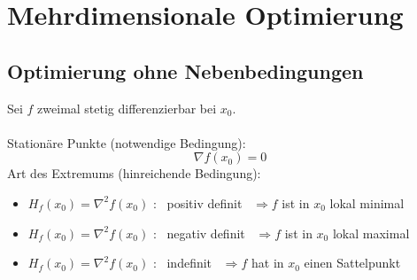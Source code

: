 \section{Mehrdimensionale Optimierung} %
\label{sec:mehrdimensionale_optimierung}

\subsection{Optimierung ohne Nebenbedingungen} %
\label{sub:optimierung_ohne_nebenbedingungen}
Sei $f$ zweimal stetig differenzierbar bei $x_0$.
\\\\Stationäre Punkte (notwendige Bedingung):
\begin{equation}
	\nabla f (x_0) = 0
\end{equation}
Art des Extremums (hinreichende Bedingung):

\begin{itemize}
	\item $H_f(x_0) = \nabla^2f(x_0)$ : \ positiv definit \  $\Rightarrow f $ ist in $ x_0 $ lokal minimal
	\item $H_f(x_0) = \nabla^2f(x_0)$ : \ negativ definit \  $\Rightarrow f $ ist in $ x_0 $ lokal maximal
	\item $H_f(x_0) = \nabla^2f(x_0)$ : \ indefinit \ $\Rightarrow f $ hat in $ x_0 $ einen Sattelpunkt
\end{itemize}
